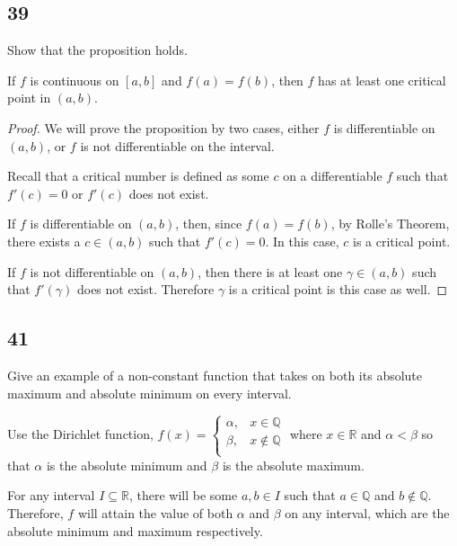 \documentclass[../hw4.tex]{subfiles}
\begin{document}
\subsection*{39}
Show that the proposition holds.

\begin{proposition}
    If $f$ is continuous on $[a,b]$ and $f(a)=f(b)$, then $f$ has at least one critical point in $(a,b)$.
\end{proposition}

\begin{proof}
    We will prove the proposition by two cases, either $f$ is differentiable on $(a,b)$, or $f$ is not differentiable on the interval.

    Recall that a critical number is defined as some $c$ on a differentiable $f$ such that $f'(c)=0$ or $f'(c)$ does not exist.

    If $f$ is differentiable on $(a,b)$, then, since $f(a)=f(b)$, by Rolle's Theorem, there exists a $c \in (a,b)$ such that $f'(c)=0$. In this case, $c$ is a critical point.

    If $f$ is not differentiable on $(a,b)$, then there is at least one $\gamma \in (a,b)$ such that $f'(\gamma)$ does not exist. Therefore $\gamma$ is a critical point is this case as well.
\end{proof}


\subsection*{41}
Give an example of a non-constant function that takes on
both its absolute maximum and absolute minimum on every
interval.

Use the Dirichlet function, $f(x) = \begin{cases}
    \alpha, & x \in \mathbb{Q} \\
    \beta, & x \notin \mathbb{Q} \\
\end{cases}$ where $x \in \mathbb{R}$ and $\alpha<\beta$ so that $\alpha$ is the absolute minimum and $\beta$ is the absolute maximum.

For any interval $I \subseteq \mathbb{R}$, there will be some $a,b \in I$ such that $a \in \mathbb{Q}$ and $b \notin \mathbb{Q}$. Therefore, $f$ will attain the value of both $\alpha$ and $\beta$ on any interval, which are the absolute minimum and maximum respectively.
\end{document}
